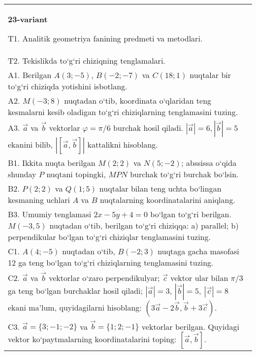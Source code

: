 \documentclass{article}
\begin{document}
\begin{tabular}{m{17cm}}
\textbf{23-variant}

T1. Analitik geometriya fanining predmeti va metodlari.
 \\
T2. 
Tekislikda to‘g‘ri chiziqning tenglamalari.
 \\
A1. 
Berilgan $A (3; -5) $, $B (-2; -7)$ va
$C (18; 1) $ nuqtalar bir to‘g‘ri chiziqda yotishini isbotlang.
 \\
A2. 
$M (-3;8) $ nuqtadan o‘tib, koordinata o‘qlaridan
teng kesmalarni kesib oladigan to‘g‘ri chiziqlarning tenglamasini tuzing.
 \\
A3. 
$\overrightarrow{a}$ va $\overrightarrow{b}$ vektorlar
$\varphi = \pi/6$ burchak hosil qiladi.
$|\overrightarrow{a}| = 6,|\overrightarrow{b}| = 5$ ekanini bilib,
$\left| \left\lbrack \overrightarrow{a},\overrightarrow{b} \right\rbrack \right|$ kattalikni hisoblang.
 \\
B1. 
Ikkita nuqta berilgan \(M (2;2) \) va \(N (5;-2) \); abssissa o‘qida shunday $P$ nuqtani topingki, $MPN$ burchak to‘g‘ri burchak bo‘lsin.
 \\
B2. 
\(P (2;2) \) va \(Q (1;5) \) nuqtalar bilan teng uchta
bo‘lingan kesmaning uchlari $A$ va $B$ nuqtalarning
koordinatalarini aniqlang.
 \\
B3. 
Umumiy tenglamasi \(2x-5y+4=0\) bo‘lgan to‘g‘ri
berilgan. \(M (-3,5) \) nuqtadan o‘tib, berilgan to‘g‘ri chiziqqa: a) parallel;
b) perpendikular bo‘lgan to‘g‘ri chiziqlar tenglamasini tuzing.
 \\
C1. 
\(A (4;-5) \) nuqtadan o‘tib, \(B (-2;3) \) nuqtaga
gacha masofasi 12 ga teng bo‘lgan to‘g‘ri chiziqlarning tenglamasini tuzing.
 \\
C2. 
$\vec{a}$ va $\vec{b}$ vektorlar o‘zaro perpendikulyar; $\vec{c}$ vektor ular bilan $\pi/3$ ga teng bo‘lgan burchaklar hosil qiladi; $|\vec{a}| = 3$, $|\vec{b}| = 5,\ |\vec{c}| = 8$ ekani ma’lum, quyidagilarni hisoblang:
$\left(3\vec{a} - 2\vec{b},\vec{b} + 3\vec{c} \right) $.
 \\
C3. 
$\vec{a} = \{ 3; - 1; - 2\}$ va $\vec{b} = \{ 1;2; - 1\}$ vektorlar berilgan. Quyidagi vektor ko‘paytmalarning koordinatalarini toping:
$\left\lbrack \vec{a},\vec{b} \right\rbrack$.
 \\

\end{tabular}
\vspace{1cm}
\end{document}
